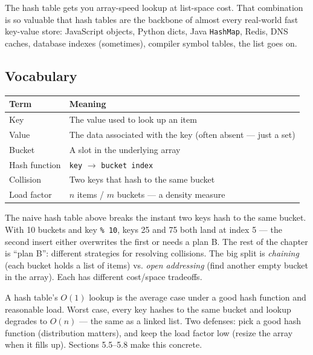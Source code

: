 \documentclass[11pt]{article}
\begin{document}
The hash table gets you array-speed lookup at list-space cost.
That combination is so valuable that hash tables are the backbone
of almost every real-world fast key-value store: JavaScript
objects, Python dicts, Java \texttt{HashMap}, Redis, DNS caches,
database indexes (sometimes), compiler symbol tables, the list
goes on.

\subsection*{Vocabulary}

\begin{center}
\begin{tabular}{|l|l|}
\hline
\textbf{Term} & \textbf{Meaning} \\
\hline
Key            & The value used to look up an item \\
Value          & The data associated with the key (often absent --- just a set) \\
Bucket         & A slot in the underlying array \\
Hash function  & \texttt{key} $\to$ \texttt{bucket index} \\
Collision      & Two keys that hash to the same bucket \\
Load factor    & $n$ items / $m$ buckets --- a density measure \\
\hline
\end{tabular}
\end{center}

\begin{ideabox}
The naive hash table above breaks the instant two keys hash to
the same bucket. With 10 buckets and key \texttt{\% 10}, keys 25
and 75 both land at index 5 --- the second insert either
overwrites the first or needs a plan B. The rest of the chapter
is ``plan B'': different strategies for resolving collisions. The
big split is \emph{chaining} (each bucket holds a list of items)
vs. \emph{open addressing} (find another empty bucket in the
array). Each has different cost/space tradeoffs.
\end{ideabox}

\begin{warnbox}
A hash table's $O(1)$ lookup is the average case under a good
hash function and reasonable load. Worst case, every key hashes
to the same bucket and lookup degrades to $O(n)$ --- the same as
a linked list. Two defenses: pick a good hash function
(distribution matters), and keep the load factor low (resize the
array when it fills up). Sections 5.5--5.8 make this concrete.
\end{warnbox}
\end{document}
